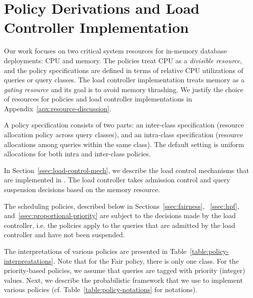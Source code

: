 \section{Policy Derivations and Load Controller Implementation}\label{sec:policy}
Our work focuses on two critical system resources for in-memory database deployments: CPU and memory. 
The policies treat CPU as a \textit{divisible resource}, and the policy specifications are defined in terms of relative CPU utilizations of queries or query classes.
The load controller implementation treats memory as a \textit{gating resource} and its goal is to avoid memory thrashing.
We justify the choice of resources for policies and load controller implementations in Appendix~\ref{apx:resource-discussion}.

A policy specification consists of two parts: an inter-class specification (resource allocation policy across query classes), and an intra-class specification (resource allocations among queries within the same class). 
The default setting is uniform allocations for both intra and inter-class policies. 

In Section~\ref{ssec:load-control-mech}, we describe the load control mechanisms that are implemented in \sys{}. 
The load controller takes admission control and query suspension decisions based on the memory resource.

The scheduling policies, described below in Sections~\ref{ssec:fairness}, ~\ref{ssec:hpf}, and~\ref{ssec:proportional-priority} are subject to the decisions made by the load controller, i.e. the policies apply to the queries that are admitted by the load controller and have not been suspended. %


The interpretations of various policies are presented in Table~\ref{table:policy-interpreatations}.
Note that for the Fair policy, there is only one class. 
For the priority-based policies, we assume that queries are tagged with priority (integer) values. 
Next, we describe the probabilistic framework that we use to implement various policies
(cf. Table~\ref{table:policy-notations} for notations).

